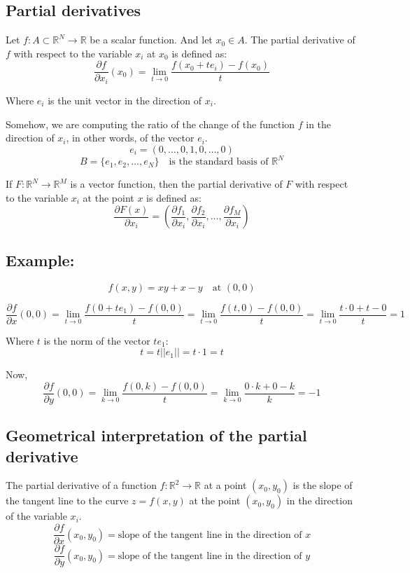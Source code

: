 \documentclass[11pt]{article}
\begin{document}
\subsection{Partial derivatives}
Let $f : A \subset \mathbb{R}^N \rightarrow \mathbb{R}$ be a scalar function. And let $x_0 \in A$. The partial derivative of $f$ with respect to the variable $x_i$ at $x_0$ is defined as:
\[
\frac{\partial f}{\partial x_i}(x_0) = \lim_{t \to 0} \frac{f(x_0 + t e_i) - f(x_0)}{t}
\]

Where $e_i$ is the unit vector in the direction of $x_i$.

Somehow, we are computing the ratio of the change of the function $f$ in the direction of $x_i$, in other words, of the vector $e_i$.
\[
e_i = (0, \ldots, 0, 1, 0, \ldots, 0)
\]
\[
B = \{e_1, e_2, \ldots, e_N\} \quad \text{is the standard basis of } \mathbb{R}^N
\]

If $F : \mathbb{R}^N \rightarrow \mathbb{R}^M$ is a vector function, then the partial derivative of $F$ with respect to the variable $x_i$ at the point $x$ is defined as:
\[
\frac{\partial F(x)}{\partial x_i} = \left(\frac{\partial f_1}{\partial x_i}, \frac{\partial f_2}{\partial x_i}, \ldots, \frac{\partial f_M}{\partial x_i}\right)
\]

\subsection*{Example:}
\[
f(x,y) = xy +x - y \quad \text{at } (0,0)
\]

\[
\frac{\partial f}{\partial x}(0,0) = \lim_{t \to 0} \frac{f(0 + t e_1) - f(0,0)}{t} = \lim_{t \to 0} \frac{f(t,0) - f(0,0)}{t} = \lim_{t \to 0} \frac{t \cdot 0 + t - 0}{t} = 1
\]

Where $t$ is the norm of the vector $t e_1$:
\[
t = t ||e_1|| = t \cdot 1 = t
\]

Now, 
\[
\frac{\partial f}{\partial y}(0,0) = \lim_{k \to 0} \frac{f(0,k) - f(0,0)}{t} = \lim_{k \to 0} \frac{0 \cdot k + 0 - k}{k} = -1
\]

\subsection{Geometrical interpretation of the partial derivative}
The partial derivative of a function $f : \mathbb{R}^2 \rightarrow \mathbb{R}$ at a point $(x_0, y_0)$ is the slope of the tangent line to the curve $z = f(x,y)$ at the point $(x_0, y_0)$ in the direction of the variable $x_i$.
\[
\frac{\partial f}{\partial x}(x_0, y_0) = \text{slope of the tangent line in the direction of } x
\]
\[
\frac{\partial f}{\partial y}(x_0, y_0) = \text{slope of the tangent line in the direction of } y
\]
\end{document}
